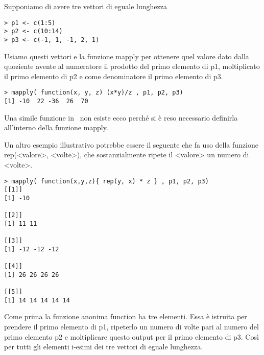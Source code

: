 Supponiamo di avere tre vettori di eguale lunghezza 
\begin{lstlisting}
> p1 <- c(1:5)
> p2 <- c(10:14)
> p3 <- c(-1, 1, -1, 2, 1)
\end{lstlisting}

Usiamo questi vettori e la funzione \textsf{mapply} per ottenere quel valore dato dalla quoziente avente al numeratore il prodotto del primo elemento di p1, moltiplicato il primo elemento di p2 e come denominatore il primo elemento di p3.

\begin{lstlisting}
> mapply( function(x, y, z) (x*y)/z , p1, p2, p3)
[1] -10  22 -36  26  70
\end{lstlisting}

Una simile funzione in \erre\ non esiste ecco perché si è reso necessario definirla all'interno della funzione \textsf{mapply}.

Un altro esempio illustrativo potrebbe essere il seguente che fa uso della funzione \textsf{rep(<valore>, <volte>)}, che sostanzialmente ripete il <valore> un numero di <volte>.
\begin{lstlisting}
> mapply( function(x,y,z){ rep(y, x) * z } , p1, p2, p3)
[[1]]
[1] -10

[[2]]
[1] 11 11

[[3]]
[1] -12 -12 -12

[[4]]
[1] 26 26 26 26

[[5]]
[1] 14 14 14 14 14
\end{lstlisting}

Come prima la funzione anonima function ha tre elementi. Essa è istruita per prendere il primo elemento di p1, ripeterlo un numero di volte pari al numero del primo elemento p2 e moltiplicare questo output per il primo elemento di p3. Così per tutti gli elementi i-esimi dei tre vettori di eguale lunghezza.